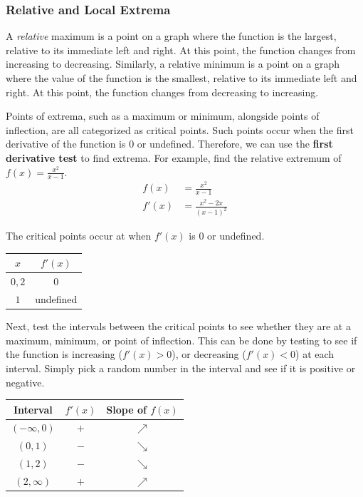 \subsubsection{Relative and Local Extrema}
A \textit{relative} maximum is a point on a graph where the function is the largest, relative to its immediate left and right. At this point, the function changes from increasing to decreasing. Similarly, a relative minimum is a point on a graph where the value of the function is the smallest, relative to its immediate left and right. At this point, the function changes from decreasing to increasing.

Points of extrema, such as a maximum or minimum, alongside points of inflection, are all categorized as critical points. Such points occur when the first derivative of the function is $0$ or undefined. Therefore, we can use the \textbf{first derivative test} to find extrema. For example, find the relative extremum of $f(x) = \frac{x^2}{x - 1}$.
\begin{align*}
	f(x) &= \frac{x^2}{x - 1} \\[5pt]
	f'(x) &= \frac{x^2 - 2x}{(x - 1)^2}
\end{align*}

\noindent The critical points occur at when $f'(x)$ is $0$ or undefined.
\begin{table}[H]
	\centering
	\begin{tabular}{|c|c|}
		\hline
		$x$ & $f'(x)$ \\
		\hline \hline
		$0, 2$ & $0$ \\
		\hline
		$1$ & undefined \\
		\hline
	\end{tabular}
\end{table}

\noindent Next, test the intervals between the critical points to see whether they are at a maximum, minimum, or point of inflection. This can be done by testing to see if the function is increasing ($f'(x) > 0$), or decreasing ($f'(x) < 0$) at each interval. Simply pick a random number in the interval and see if it is positive or negative.
\begin{table}[H]
	\centering
	\begin{tabular}{|c|c|c|}
		\hline
		Interval & $f'(x)$ & Slope of $f(x)$ \\
		\hline \hline
		$(-\infty, 0)$ & $+$ & $\nearrow$ \\
		\hline
		$(0, 1)$ & $-$ & $\searrow$ \\
		\hline
		$(1, 2)$ & $-$ & $\searrow$ \\
		\hline
		$(2, \infty)$ & $+$ & $\nearrow$ \\
		\hline
	\end{tabular}
\end{table}

